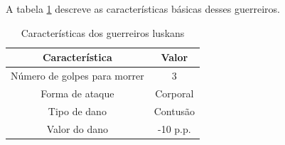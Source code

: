 A tabela \ref{table:luskans} descreve as características básicas desses guerreiros.
\begin{table}[ht]
\begin{center}
\begin{tabular}{|c|c|}
\hline 
\textbf{Característica} & \textbf{Valor} \\ 
\hline 
Número de golpes para morrer & 3\\ 
\hline 
Forma de ataque & Corporal\\ 
\hline 
Tipo de dano &  Contusão \\ 
\hline 
Valor do dano & -10 p.p. \\ 
\hline 
\end{tabular} 
\end{center}
\caption{Características dos guerreiros luskans}
\label{table:luskans}
\end{table}
